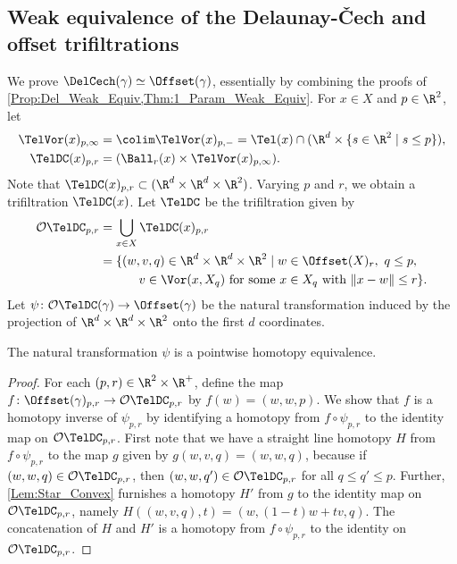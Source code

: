 \subsection{Weak equivalence of the Delaunay-\v Cech and offset trifiltrations}\label{def:teldelcech}
%
We prove $\DelCech(\gamma)\simeq \Offset(\gamma)$, essentially by combining the proofs of \cref{Prop:Del_Weak_Equiv,Thm:1_Param_Weak_Equiv}.   For $x\in X$ and $p\in \R^2$, let 
\begin{align*}
\TelVor(x)_{p,\infty}&=\colim \TelVor(x)_{p,-}=\Tel(x)\cap (\R^d\times \{s\in \R^2\mid s\leq p\}),\\
\TelDC(x)_{p,r}& =  (\Ball_r(x)\times \TelVor(x)_{p,\infty}).
\end{align*} 
 Note that $\TelDC(x)_{p,r}\subset (\R^d\times \R^d\times \R^2)$.  Varying $p$ and $r$, we obtain a trifiltration $\TelDC(x)$.  Let $\TelDC$ be the trifiltration given by 
\begin{align*}
\mathcal O\TelDC_{p,r}&=\bigcup_{x\in X} \TelDC(x)_{p,r}\\
                          &=\{(w,v,q)\in \R^d\times \R^d\times \R^2 \mid w\in \Offset(X)_r,\ q\leq p,\\
                          &\, \quad \qquad v\in \Vor(x,X_q)\textup{ for some }x\in X_q \textup{ with }\|x-w\|\leq r\}.
                      \end{align*}
%
Let $\psi\colon \mathcal O\TelDC(\gamma)\to \Offset(\gamma)$ be the natural transformation induced by the projection of $\R^d\times \R^d\times \R^2$ onto the first $d$ coordinates.
\begin{proposition}\label{prop:TelVOequiv} The natural transformation $\psi$ is a pointwise homotopy equivalence.  
\end{proposition}
%
\begin{proof}
For each $(p,r)\in \R^2\times \R^+$, define the map $f\colon \Offset(\gamma)_{p,r}\to \mathcal O\TelDC_{p,r}$ by $f(w)=(w,w,p)$.  We show that $f$ is a homotopy inverse of $\psi_{p,r}$ by identifying a homotopy from $f\circ \psi_{p,r}$ to the identity map on $\mathcal O\TelDC_{p,r}$.  First note that we have a straight line homotopy $H$ from $f\circ \psi_{p,r}$ to the map $g$ given by $g(w,v,q)=(w,w,q)$, because if $(w,w,q)\in \mathcal O\TelDC_{p,r}$, then $(w,w,q')\in \mathcal O\TelDC_{p,r}$ for all $q\leq q'\leq p$.  Further,  \cref{Lem:Star_Convex} furnishes a homotopy $H'$ from $g$ to the identity map on $\mathcal O\TelDC_{p,r}$, namely $H((w,v,q),t)=(w,(1-t)w+tv,q)$.   The concatenation of $H$ and $H'$ is a homotopy from $f\circ \psi_{p,r}$ to the identity on $\mathcal O\TelDC_{p,r}$.
\end{proof}
